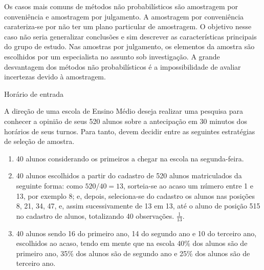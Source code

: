 Os casos mais comuns de métodos não probabilísticos são amostragem por conveniência e amostragem por julgamento. A amostragem por conveniência carateriza-se por não ter um plano particular de amostragem. O objetivo nesse caso não seria generalizar conclusões e sim descrever as características principais do grupo de estudo.  Nas amostras por julgamento, os elementos da amostra são escolhidos por um especialista no assunto sob investigação. A grande desvantagem dos métodos não probabilísticos é a impossibilidade de avaliar incertezas devido à amostragem.

\begin{example}{Horário de entrada}

A direção de uma escola de Ensino Médio deseja realizar uma pesquisa para conhecer a opinião de seus 520 alunos sobre a antecipação em 30 minutos dos horários de seus turnos. Para tanto, devem decidir entre as seguintes estratégias de seleção de amostra.
\begin{enumerate}
\item {} 
40 alunos considerando os primeiros a chegar na  escola na segunda-feira.  

\item {} 
40 alunos escolhidos a partir do cadastro de 520 alunos matriculados da seguinte forma: como \(520/40=13\), sorteia-se ao acaso um número entre 1 e 13, por exemplo 8; e, depois, seleciona-se do cadastro os alunos nas posições 8, 21, 34, 47,  e, assim sucessivamente de 13 em 13, até o aluno de posição 515 no cadastro de alunos, totalizando 40 observações.  \(\frac{1}{13}\). 

\item {} 
40 alunos sendo 16 do primeiro ano, 14 do segundo ano e 10 do terceiro ano, escolhidos ao acaso, tendo em mente que na escola 40\% dos alunos são de primeiro ano, 35\% dos alunos são de segundo ano e 25\% dos alunos são de terceiro ano. 


\end{enumerate}
\end{example}
